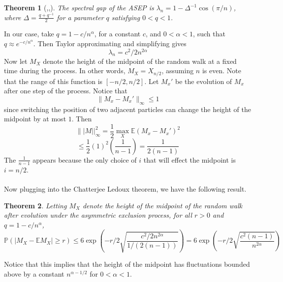 \documentclass[12pt]{report}
\newtheorem{thm}{Theorem}[section]
\theoremstyle{definition}
\begin{document}
\begin{thm}[\cite{KomaNach},\cite{Alcaraz},\cite{CapMar}] The spectral gap of the ASEP is $\lambda_n=1-\Delta^{-1}\cos(\pi/n)$, where $\Delta=\frac{q+q^{-1}}{2}$ for a parameter $q$ satisfying $0<q<1$.
\end{thm}
In our case, take $q=1-c/n^{\alpha}$, for a constant $c$, and $0<\alpha<1$, such that 
$q\approx e^{-c/n^{\alpha}}$.  Then Taylor approximating and simplifying gives 
$$
\lambda_n=c^2/2n^{2\alpha}
$$
Now let $M_X$ denote the height of the midpoint of the random walk at a fixed time during the process.  In other words, $M_X=X_{n/2}$, assuming $n$ is even.  Note that the range of this function is $[-n/2,n/2]$. Let $M_x'$ be the evolution of $M_x$ after one step of the process.  Notice that $$\|M_x-M_x'\|_{\infty}\leq 1$$ since switching the position of two adjacent particles can change the height of the midpoint by at most $1$.  Then 
$$
\||M||_{\infty}^2=\frac{1}{2}\max_{X}\mathbb{E}(M_x-M_x')^2
$$
$$
\leq \frac{1}{2}(1)^2\left(\frac{1}{n-1}\right)=\frac{1}{2(n-1)}
$$
The $\frac{1}{n-1}$ appears because the only choice of $i$ that will effect the midpoint is $i=n/2$.  \\ \\
Now plugging into the Chatterjee Ledoux theorem, we have the following result.
\begin{thm}
Letting $M_X$ denote the height of the midpoint of the random walk after evolution under the asymmetric exclusion process, for all $r>0$ and $q=1-c/n^{\alpha}$,
$$
\mathbb{P}(|M_X-\mathbb{E}M_X|\geq r)\leq 6\exp\left(-r/2\sqrt{\frac{c^2/2n^{2\alpha}}{1/(2(n-1))}}\right) =6\exp\left(-r/2\sqrt{\frac{c^2(n-1)}{n^{2\alpha}}}\right)
$$
\end{thm}
\noindent
Notice that this implies that the height of the midpoint has fluctuations bounded above by a constant $n^{\alpha-1/2}$  for $0<\alpha<1$. 
\end{document}
